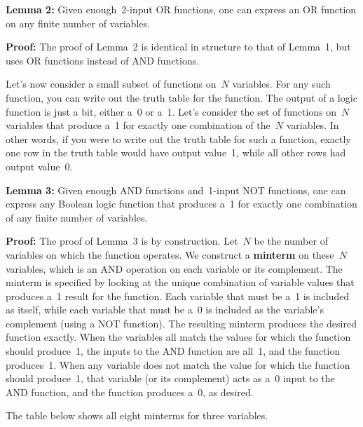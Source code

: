 {\bf Lemma 2:}
%
Given enough~\mbox{2-input} OR functions, one can express an OR function
on any finite number of variables.

{\bf Proof:}
%
The proof of Lemma~2 is identical in structure to that of Lemma~1, but
uses OR functions instead of AND functions.


Let's now consider a small subset of functions on~$N$ variables.  
For any such function, you can write out the truth table for the
function.  The output of a logic function is just a bit, 
either a~0 or a~1.  Let's consider the set of functions on~$N$
variables that produce a~1 for exactly one combination of the~$N$
variables.  In other words, if you were to write out the truth
table for such a function, exactly one row in the truth table would
have output value~1, while all other rows had output value~0.

{\bf Lemma 3:}
%
Given enough AND functions and~\mbox{1-input}
NOT functions, one can express any Boolean logic function 
that produces a~1 for exactly one combination of
any finite number of variables.

{\bf Proof:}
%
The proof of Lemma~3 is by construction.
Let~$N$ be the number of variables on which the function operates.
We construct a {\bf minterm} on these~$N$ variables,
which is an AND operation on each variable or its complement.
The minterm is specified by looking at the unique combination of 
variable values that produces a~1 result for the function.
Each variable that must be a~1 is included as itself, while
each variable that must be a~0 is included as the variable's complement
(using a NOT function).  The resulting minterm produces the
desired function exactly.  When the variables all match
the values for which the function should produce~1, the
inputs to the AND function are all~1, and the function produces~1.
When any variable does not match the value for which the function
should produce~1, that variable (or its complement) acts as a~0
input to the AND function, and the function produces a~0, as desired.

The table below shows all eight minterms for three variables.\\

